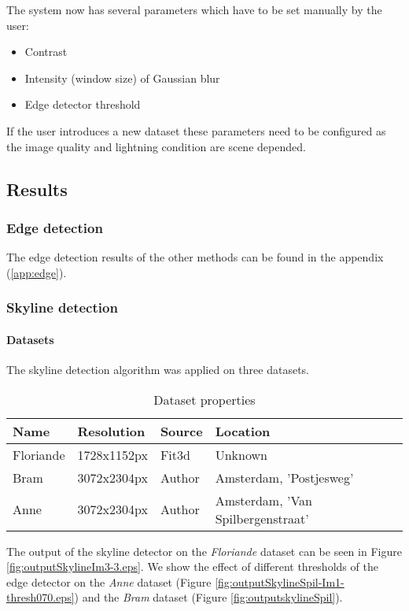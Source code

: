 The system now has several parameters which have to be set manually by the user:
\begin{itemize}
	\item Contrast
	\item Intensity (window size) of Gaussian blur
	\item Edge detector threshold
\end{itemize}

If the user introduces a new dataset these parameters need to be configured
as the image quality and lightning condition are scene depended.


\subsection{Results}
\subsubsection{Edge detection}
\label{sec:ResultEdge}
The edge detection results of the other methods can be found in the appendix
(\ref{app:edge}).
\clearpage


\subsubsection{Skyline detection}
\paragraph{Datasets}
The skyline detection algorithm was applied on three datasets. 

\begin{table}[ht]
\caption{Dataset properties}
\begin{tabular}{|l||l|l|l|}
\hline
Name 	& Resolution 	& Source	& Location\\
\hline
\hline
Floriande & 1728x1152px  & Fit3d \cite{Fit3d}  	& Unknown\\
\hline
Bram	 & 3072x2304px  & Author					& Amsterdam, 'Postjesweg'\\
\hline
Anne	& 3072x2304px  & Author					& Amsterdam, 'Van Spilbergenstraat'\\
\hline
\end{tabular}
\end{table}

The output of the skyline detector on the \emph{Floriande}
dataset \cite{Fit3d} can be seen in Figure \ref{fig:outputSkylineIm3-3.eps}.
We show the effect of different thresholds of the edge detector on the
\emph{Anne} dataset (Figure \ref{fig:outputSkylineSpil-Im1-thresh070.eps})
and the 
\emph{Bram} dataset (Figure \ref{fig:outputskylineSpil}). 


